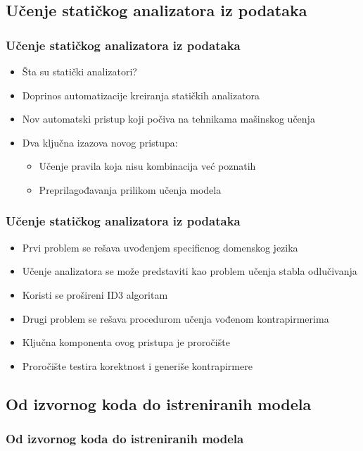\documentclass[11pt]{beamer}
\theoremstyle{definition}
\begin{document}
{%
\subsection{Učenje statičkog analizatora iz podataka}
\label{subsec:staticki-analizator}
\begin{frame}
\frametitle{Učenje statičkog analizatora iz podataka}

\begin{itemize}
	\item Šta su statički analizatori?
	\item Doprinos automatizacije kreiranja statičkih analizatora
	\item Nov automatski pristup koji počiva na tehnikama mašinskog učenja
	\item Dva ključna izazova novog pristupa:
	\begin{itemize}
		\item Učenje pravila koja nisu kombinacija već poznatih
		\item Preprilagođavanja prilikom učenja modela
	\end{itemize}
	
\end{itemize}

\end{frame}

\begin{frame}
\frametitle{Učenje statičkog analizatora iz podataka}

\begin{itemize}
	\item Prvi problem se rešava uvođenjem specificnog domenskog jezika
	\item Učenje analizatora se može predstaviti kao problem učenja stabla odlučivanja
	\item Koristi se prošireni ID3 algoritam
	\item Drugi problem se rešava procedurom učenja vođenom kontrapirmerima
	\item Ključna komponenta ovog pristupa je proročište
	\item Proročište testira korektnost i generiše kontrapirmere
	
\end{itemize}
\end{frame}


\subsection{Od izvornog koda do istreniranih modela}
\label{subsec:WEKA}
\begin{frame}
\frametitle{Od izvornog koda do istreniranih modela}



\end{frame}}
\end{document}
